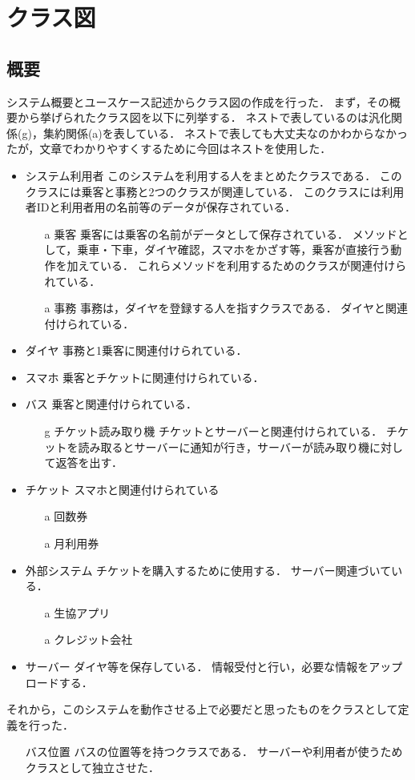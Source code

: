 \documentclass[documentclass]{jsarticle}
\begin{document}
\newpage

\section{クラス図}
\subsection*{概要}
システム概要とユースケース記述からクラス図の作成を行った．
まず，その概要から挙げられたクラス図を以下に列挙する．
ネストで表しているのは汎化関係(g)，集約関係(a)を表している．
ネストで表しても大丈夫なのかわからなかったが，文章でわかりやすくするために今回はネストを使用した．
\begin{itemize}
  \item システム利用者 このシステムを利用する人をまとめたクラスである．
  このクラスには乗客と事務と2つのクラスが関連している．
  このクラスには利用者IDと利用者用の名前等のデータが保存されている．
  \begin{itemize}
    \item[a] 乗客 乗客には乗客の名前がデータとして保存されている． 
    メソッドとして，乗車・下車，ダイヤ確認，スマホをかざす等，乗客が直接行う動作を加えている．
    これらメソッドを利用するためのクラスが関連付けられている．
    \item[a] 事務 事務は，ダイヤを登録する人を指すクラスである．
    ダイヤと関連付けられている．
  \end{itemize}
  \item ダイヤ 事務と1乗客に関連付けられている．
  \item スマホ 乗客とチケットに関連付けられている．
  \item バス 乗客と関連付けられている．
  \begin{itemize}
    \item[g] チケット読み取り機 チケットとサーバーと関連付けられている．
    チケットを読み取るとサーバーに通知が行き，サーバーが読み取り機に対して返答を出す．
  \end{itemize}
  \item チケット スマホと関連付けられている
  \begin{itemize}
    \item[a] 回数券
    \item[a] 月利用券
  \end{itemize}
  \item 外部システム チケットを購入するために使用する．
  サーバー関連づいている．
  \begin{itemize}
    \item[a] 生協アプリ
    \item[a] クレジット会社
  \end{itemize}
  \item サーバー ダイヤ等を保存している．
  情報受付と行い，必要な情報をアップロードする．
\end{itemize}
それから，このシステムを動作させる上で必要だと思ったものをクラスとして定義を行った．
\begin{itemize}
  \item[バス位置] バスの位置等を持つクラスである．
  サーバーや利用者が使うためクラスとして独立させた．   
\end{itemize}
\end{document}

